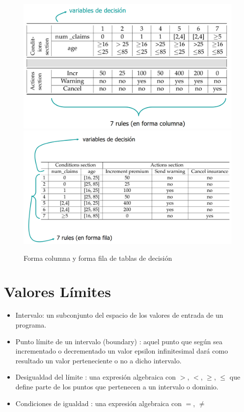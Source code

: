 \begin{figure}[htbp]
   \centering
   \includegraphics{images/05/tablaForma1.png}
   \includegraphics{images/05/tablaForma2.png}
   \caption{Forma columna y forma fila de tablas de decisión}
   \label{fig:05/tablaForma}
\end{figure}

\section{Valores Límites}
\begin{itemize}
	\item Intervalo: un subconjunto del espacio de los valores de entrada de
un programa.
	\item Punto límite de un intervalo (boundary) : aquel punto que según
sea incrementado o decrementado un valor epsilon infinitesimal
dará como resultado un valor perteneciente o no a dicho intervalo.
	\item Desigualdad del límite : una expresión algebraica con $>$, $<$, $\geq$, $\leq$
que define parte de los puntos que pertenecen a un intervalo o
dominio.
	\item Condiciones de igualdad : una expresión algebraica con $=$, $\neq$
\end{itemize}

